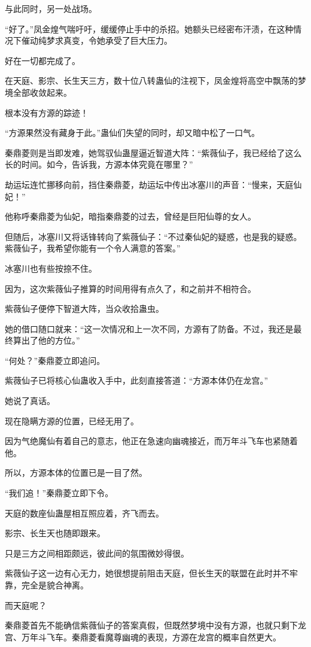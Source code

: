 \begin{this_body}
与此同时，另一处战场。

“好了。”凤金煌气喘吁吁，缓缓停止手中的杀招。她额头已经密布汗渍，在这种情况下催动纯梦求真变，令她承受了巨大压力。

好在一切都完成了。

在天庭、影宗、长生天三方，数十位八转蛊仙的注视下，凤金煌将高空中飘荡的梦境全部收敛起来。

根本没有方源的踪迹！

“方源果然没有藏身于此。”蛊仙们失望的同时，却又暗中松了一口气。

秦鼎菱则是当即发难，她驾驭仙蛊屋逼近智道大阵：“紫薇仙子，我已经给了这么长的时间。如今，告诉我，方源本体究竟在哪里？”

劫运坛连忙挪移向前，挡住秦鼎菱，劫运坛中传出冰塞川的声音：“慢来，天庭仙妃！”

他称呼秦鼎菱为仙妃，暗指秦鼎菱的过去，曾经是巨阳仙尊的女人。

但随后，冰塞川又将话锋转向了紫薇仙子：“不过秦仙妃的疑惑，也是我的疑惑。紫薇仙子，我希望你能有一个令人满意的答案。”

冰塞川也有些按捺不住。

因为，这次紫薇仙子推算的时间用得有点久了，和之前并不相符合。

紫薇仙子便停下智道大阵，当众收拾蛊虫。

她的借口随口就来：“这一次情况和上一次不同，方源有了防备。不过，我还是最终算出了他的方位。”

“何处？”秦鼎菱立即追问。

紫薇仙子已将核心仙蛊收入手中，此刻直接答道：“方源本体仍在龙宫。”

她说了真话。

现在隐瞒方源的位置，已经无用了。

因为气绝魔仙有着自己的意志，他正在急速向幽魂接近，而万年斗飞车也紧随着他。

所以，方源本体的位置已是一目了然。

“我们追！”秦鼎菱立即下令。

天庭的数座仙蛊屋相互照应着，齐飞而去。

影宗、长生天也随即跟来。

只是三方之间相距颇远，彼此间的氛围微妙得很。

紫薇仙子这一边有心无力，她很想提前阻击天庭，但长生天的联盟在此时并不牢靠，完全是貌合神离。

而天庭呢？

秦鼎菱首先不能确信紫薇仙子的答案真假，但既然梦境中没有方源，也就只剩下龙宫、万年斗飞车。秦鼎菱看魔尊幽魂的表现，方源在龙宫的概率自然更大。


\end{this_body}
